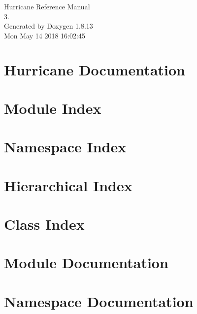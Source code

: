 \documentclass[a4paper]{asimbook}
\begin{document}
   \begin{titlepage}
     \vspace*{7cm}
     \begin{center}
     {\Large Hurricane Reference Manual\\[1ex]\large 3. }\\
     \vspace*{1cm}
     {\large Generated by Doxygen 1.8.13}\\
     \vspace*{0.5cm}
     {\small Mon May 14 2018 16:02:45}\\
     \end{center}
   \end{titlepage}

   \clearemptydoublepage

   \tableofcontents
   \clearemptydoublepage

\chapter{Hurricane Documentation}
\label{index}\hypertarget{index}{}
\chapter{Module Index}

\chapter{Namespace Index}

\chapter{Hierarchical Index}

\chapter{Class Index}

\chapter{Module Documentation}




\chapter{Namespace Documentation}

\end{document}
